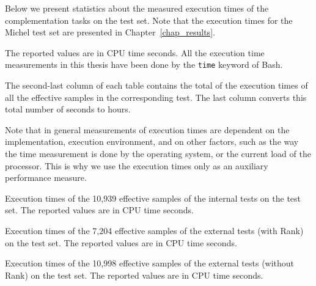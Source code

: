 Below we present statistics about the measured execution times of the complementation tasks on the \goal{} test set. Note that the execution times for the Michel test set are presented in Chapter~\ref{chap_results}.

The reported values are in CPU time seconds. All the execution time measurements in this thesis have been done by the \texttt{time} keyword of Bash.

The second-last column of each table contains the total of the execution times of all the effective samples in the corresponding test. The last column converts this total number of seconds to hours.

Note that in general measurements of execution times are dependent on the implementation, execution environment, and on other factors, such as the way the time measurement is done by the operating system, or the current load of the processor. This is why we use the execution times only as an auxiliary performance measure.



\vskip0.5cm
\begin{table}[htb]
\centering

\caption{Execution times of the 10,939 effective samples of the internal tests on the \goal{} test set. The reported values are in CPU time seconds.} 
\end{table}
\vskip0.25cm
\begin{table}[htb]
\centering

\caption{Execution times of the 7,204 effective samples of the external tests (with Rank) on the \goal{} test set. The reported values are in CPU time seconds.}
\end{table}

\makeatletter
\setlength{\@fptop}{5pt}
\makeatother

\begin{table}[htb]
\centering

\caption{Execution times of the 10,998 effective samples of the external tests (without Rank) on the \goal{} test set. The reported values are in CPU time seconds.} 
\end{table}
